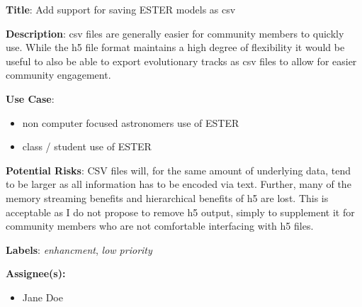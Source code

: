 \documentclass{ol-softwaremanual}
\begin{document}
\begin{example}
    \textbf{Title}: Add support for saving ESTER models as csv
    
    \textbf{Description}:
    csv files are generally easier for community members to quickly use. While the h5 file format maintains a high degree of flexibility it would be useful to also be able to export evolutionary tracks as csv files to allow for easier community engagement.
    
    \textbf{Use Case}:
    \begin{itemize}
        \item non computer focused astronomers use of ESTER
        \item class / student use of ESTER
    \end{itemize}
    \textbf{Potential Risks}:
    CSV files will, for the same amount of underlying data, tend to be larger as all information has to be encoded via text. Further, many of the memory streaming benefits and hierarchical benefits of h5 are lost. This is acceptable as I do not propose to remove h5 output, simply to supplement it for community members who are not comfortable interfacing with h5 files.
    
    \textbf{Labels}:
    \textit{enhancment}, \textit{low priority}
    
    \textbf{Assignee(s):}
    \begin{itemize}
        \item Jane Doe
    \end{itemize}
\end{example}
\end{document}
